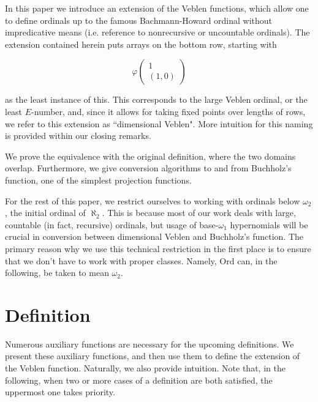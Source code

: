 \documentclass{article}
\theoremstyle{definition}
\theoremstyle{plain}
\theoremstyle{plain}
\theoremstyle{plain}
\theoremstyle{plain}
\theoremstyle{remark}
\theoremstyle{remark}
\theoremstyle{remark}
\theoremstyle{plain}
\theoremstyle{plain}
\begin{document}
In this paper we introduce an extension of the Veblen functions, which allow one to define ordinals up to the famous Bachmann-Howard ordinal without impredicative means (i.e. reference to nonrecursive or uncountable ordinals). The extension contained herein puts arrays on the bottom row, starting with

\begin{equation}
\varphi\left(\begin{matrix}1\\(1,0)\end{matrix}\right)
\end{equation}

as the least instance of this. This corresponds to the large Veblen ordinal, or the least $E$-number, and, since it allows for taking fixed points over lengths of rows, we refer to this extension as ``dimensional Veblen". More intuition for this naming is provided within our closing remarks.

We prove the equivalence with the original definition, where the two domains overlap. Furthermore, we give conversion algorithms to and from Buchholz's function, one of the simplest projection functions.

For the rest of this paper, we restrict ourselves to working with ordinals below $\omega_2$, the initial ordinal of $\aleph_2$. This is because most of our work deals with large, countable (in fact, recursive) ordinals, but usage of base-$\omega_1$ hypernomials will be crucial in conversion between dimensional Veblen and Buchholz's function. The primary reason why we use this technical restriction in the first place is to ensure that we don't have to work with proper classes. Namely, $\mathrm{Ord}$ can, in the following, be taken to mean $\omega_2$.

\section{Definition}
Numerous auxiliary functions are necessary for the upcoming definitions. We present these auxiliary functions, and then use them to define the extension of the Veblen function. Naturally, we also provide intuition. Note that, in the following, when two or more cases of a definition are both satisfied, the uppermost one takes priority. 
\end{document}
